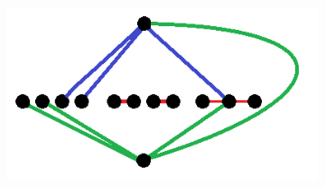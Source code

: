 \documentclass[10pt]{article}
\begin{document}
\begin{itemize}
\begin{center}
\begin{figure}[h]
\begin{subfigure}[b]{0.4\linewidth}
		\end{subfigure}
		\begin{subfigure}[b]{0.2\linewidth}
			\includegraphics[width=\linewidth]{grafoEsercizio5}
		\end{subfigure}
	\end{figure}
	\end{center}
	\end{itemize}
\end{document}

